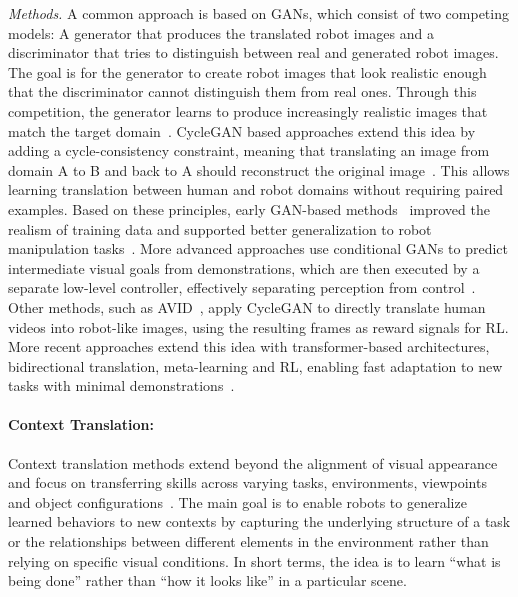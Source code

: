     \textit{Methods.} A common approach is based on \acp{GAN}, which consist of two competing models: A generator that produces the translated robot images and a discriminator that tries to distinguish between real and generated robot images. The goal is for the generator to create robot images that look realistic enough that the discriminator cannot distinguish them from real ones. Through this competition, the generator learns to produce increasingly realistic images that match the target domain~\cite{Isola2016ImagetoImageTW, Zhu2017TowardMI, Liu2017UnsupervisedIT}. CycleGAN based approaches extend this idea by adding a cycle-consistency constraint, meaning that translating an image from domain A to B and back to A should reconstruct the original image~\cite{Zhu2017UnpairedIT}. This allows learning translation between human and robot domains without requiring paired examples.
    Based on these principles, early \ac{GAN}-based methods~\cite{Isola2016ImagetoImageTW, Zhu2017TowardMI, Liu2017UnsupervisedIT} improved the realism of training data and supported better generalization to robot manipulation tasks~\cite{erdei2024image}. More advanced approaches use conditional \acp{GAN} to predict intermediate visual goals from demonstrations, which are then executed by a separate low-level controller, effectively separating perception from control~\cite{Sharma2019ThirdPersonVI}. Other methods, such as AVID~\cite{Smith2019AVIDLM}, apply CycleGAN to directly translate human videos into robot-like images, using the resulting frames as reward signals for \ac{RL}. More recent approaches extend this idea with transformer-based architectures, bidirectional translation, meta-learning and \ac{RL}, enabling fast adaptation to new tasks with minimal demonstrations~\cite{Dasari2020TransformersFO, Li2022MetaImitationLB}.


    \paragraph{Context Translation:}
    Context translation methods extend beyond the alignment of visual appearance and focus on transferring skills across varying tasks, environments, viewpoints and object configurations~\cite{Liu2023CEILGC}. The main goal is to enable robots to generalize learned behaviors to new contexts by capturing the underlying structure of a task or the relationships between different elements in the environment rather than relying on specific visual conditions. In short terms, the idea is to learn ``what is being done'' rather than ``how it looks like'' in a particular scene.

